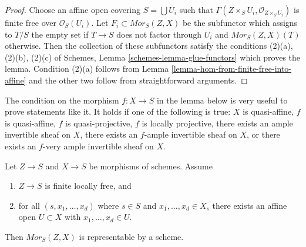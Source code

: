 \begin{proof}
Choose an affine open covering $S = \bigcup U_i$ such that
$\Gamma(Z \times_S U_i, \mathcal{O}_{Z \times_S U_i})$ is
finite free over $\mathcal{O}_S(U_i)$. Let $F_i \subset \mathit{Mor}_S(Z, X)$
be the subfunctor which assigns to $T/S$ the empty set if
$T \to S$ does not factor through $U_i$ and $\mathit{Mor}_S(Z, X)(T)$
otherwise. Then the collection of these subfunctors satisfy the conditions
(2)(a), (2)(b), (2)(c) of
Schemes, Lemma \ref{schemes-lemma-glue-functors} which proves the lemma.
Condition (2)(a) follows from
Lemma \ref{lemma-hom-from-finite-free-into-affine}
and the other two follow from straightforward arguments.
\end{proof}

\noindent
The condition on the morphism $f : X \to S$ in the lemma below is very
useful to prove statements like it. It holds if one of the following
is true: $X$ is quasi-affine, $f$ is quasi-affine, $f$ is quasi-projective,
$f$ is locally projective, there exists an ample invertible sheaf on $X$,
there exists an $f$-ample invertible sheaf on $X$, or
there exists an $f$-very ample invertible sheaf on $X$.

\begin{lemma}
\label{lemma-hom-from-finite-locally-free-representable}
Let $Z \to S$ and $X \to S$ be morphisms of schemes.
Assume
\begin{enumerate}
\item $Z \to S$ is finite locally free, and
\item for all $(s, x_1, \ldots, x_d)$ where $s \in S$ and
$x_1, \ldots, x_d \in X_s$ there exists an affine open $U \subset X$
with $x_1, \ldots, x_d \in U$.
\end{enumerate}
Then $\mathit{Mor}_S(Z, X)$ is representable by a scheme.
\end{lemma}

